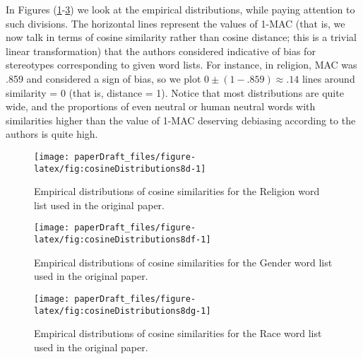 \documentclass[
  12pt,
  dvipsnames,enabledeprecatedfontcommands]{scrartcl}
\begin{document}
In Figures (\ref{fig:empirical0}-\ref{fig:empirical3}) we look at the
empirical distributions, while paying attention to such divisions. The
horizontal lines represent the values of 1-\textsf{MAC} (that is, we now
talk in terms of cosine similarity rather than cosine distance; this is
a trivial linear transformation) that the authors considered indicative
of bias for stereotypes corresponding to given word lists. For instance,
in religion, \textsf{MAC} was .859 and considered a sign of bias, so we
plot \(0\pm (1-.859)\approx .14\) lines around similarity = 0 (that is,
distance = 1). Notice that most distributions are quite wide, and the
proportions of even neutral or human neutral words with similarities
higher than the value of 1-\textsf{MAC} deserving debiasing according to
the authors is quite high.

\begin{figure}[H]

\begin{center}\texttt{[image: paperDraft\_files/figure-latex/fig:cosineDistributions8d-1]} \end{center}

\caption{Empirical distributions of cosine similarities  for the Religion word list  used in  the original paper. }

\label{fig:empirical0}
\end{figure}

\begin{figure}[H]

\begin{center}\texttt{[image: paperDraft\_files/figure-latex/fig:cosineDistributions8df-1]} \end{center}

\caption{Empirical distributions of cosine similarities for the Gender word list used in  the original paper.  }

\label{fig:empirical2}
\end{figure}

\begin{figure}[H]

\begin{center}\texttt{[image: paperDraft\_files/figure-latex/fig:cosineDistributions8dg-1]} \end{center}

\caption{Empirical distributions of cosine similarities  for the Race word list used in  the original paper.  }

\label{fig:empirical3}
\end{figure}
\end{document}
